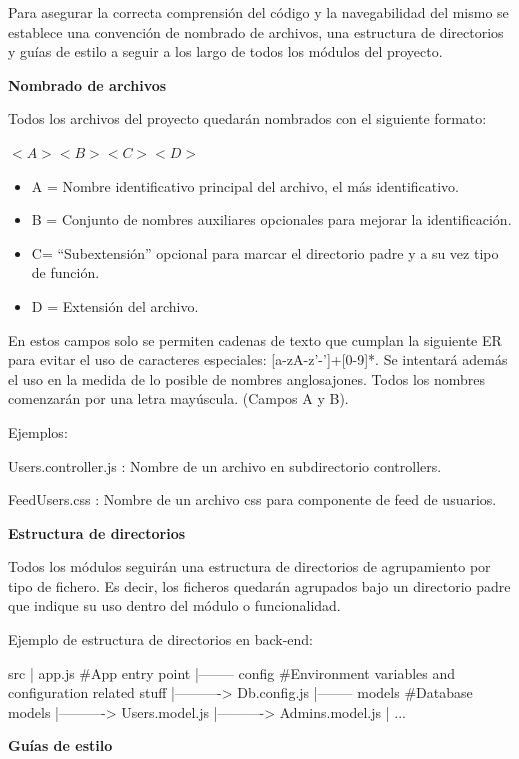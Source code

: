 \documentclass{article}
\begin{document}
Para asegurar la correcta comprensión del código y la navegabilidad del mismo se establece una convención 
de nombrado de archivos, una estructura de directorios y guías de estilo a seguir a los largo de todos los 
módulos del proyecto.

\textbf{Nombrado de archivos}

Todos los archivos del proyecto quedarán nombrados con el siguiente formato:

$<A><B><C><D>$

\begin{itemize}
    \setlength{\itemsep}{0em} %
    \item A = Nombre identificativo principal del archivo, el más identificativo.
    \item B = Conjunto de nombres auxiliares opcionales para mejorar la identificación.
    \item C= “Subextensión” opcional para marcar el directorio padre y a su vez tipo de función.
    \item D = Extensión del archivo.
\end{itemize}

En estos campos solo se permiten cadenas de texto que cumplan la siguiente ER para evitar el uso de 
caracteres especiales: [a-zA-z'-']+[0-9]*.
Se intentará además el uso en la medida de lo posible de nombres anglosajones.
Todos los nombres comenzarán por una letra mayúscula. (Campos A y B).

Ejemplos: 

Users.controller.js : Nombre de un archivo en subdirectorio controllers.

FeedUsers.css :  Nombre de un archivo css para componente de feed de usuarios.
\pagebreak

\textbf{Estructura de directorios}

Todos los módulos seguirán una estructura de directorios de agrupamiento por tipo de fichero. 
Es decir, los ficheros quedarán agrupados bajo un directorio padre que indique su uso dentro del módulo o funcionalidad.

Ejemplo de estructura de directorios en back-end:

src
|	app.js	\#App entry point
|-------- config 	\#Environment variables and configuration related stuff
|----------> Db.config.js
|-------- models \#Database models
|----------> Users.model.js
|----------> Admins.model.js
| ...


\textbf{Guías de estilo}
\end{document}
